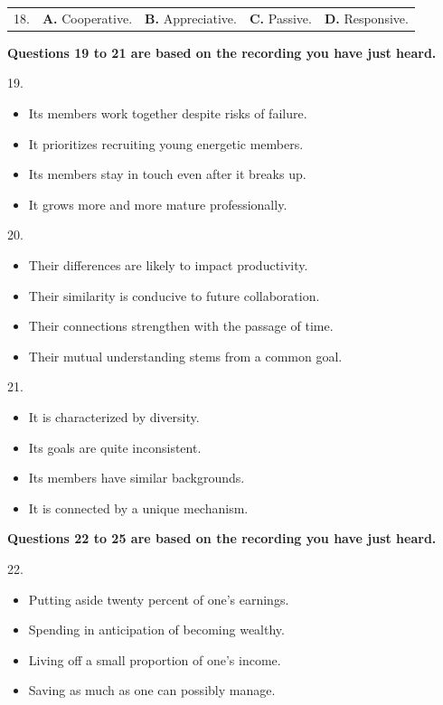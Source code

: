 \documentclass[UTF8,11pt]{ctexart}
\begin{document}
\noindent\begin{tabularx}{\linewidth}{@{}lXXXX@{}}18. & \textbf{A.} Cooperative. & \textbf{B.} Appreciative. & \textbf{C.} Passive. & \textbf{D.} Responsive.\\\end{tabularx}\par

\textbf{Questions 19 to 21 are based on the recording you have just heard.}


19.


\begin{itemize}[leftmargin=2em,itemsep=.2em,topsep=.4em]\item[A.] Its members work together despite risks of failure.
\item[B.] It prioritizes recruiting young energetic members.
\item[C.] Its members stay in touch even after it breaks up.
\item[D.] It grows more and more mature professionally.
\end{itemize}

20.


\begin{itemize}[leftmargin=2em,itemsep=.2em,topsep=.4em]\item[A.] Their differences are likely to impact productivity.
\item[B.] Their similarity is conducive to future collaboration.
\item[C.] Their connections strengthen with the passage of time.
\item[D.] Their mutual understanding stems from a common goal.
\end{itemize}

21.


\begin{itemize}[leftmargin=2em,itemsep=.2em,topsep=.4em]\item[A.] It is characterized by diversity.
\item[B.] Its goals are quite inconsistent.
\item[C.] Its members have similar backgrounds.
\item[D.] It is connected by a unique mechanism.
\end{itemize}

\textbf{Questions 22 to 25 are based on the recording you have just heard.}


22.


\begin{itemize}[leftmargin=2em,itemsep=.2em,topsep=.4em]\item[A.] Putting aside twenty percent of one's earnings.
\item[B.] Spending in anticipation of becoming wealthy.
\item[C.] Living off a small proportion of one's income.
\item[D.] Saving as much as one can possibly manage.
\end{itemize}
\end{document}
